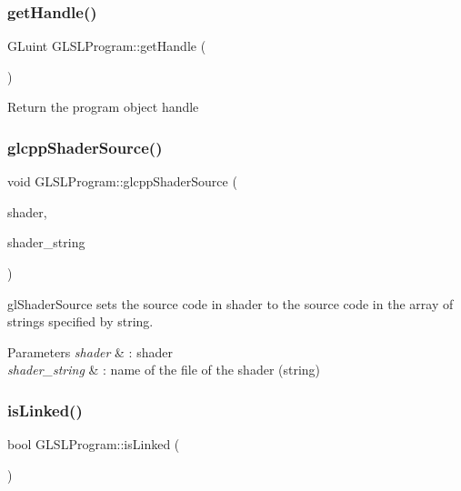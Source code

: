 \subsubsection{\texorpdfstring{get\+Handle()}{getHandle()}}
{\footnotesize\ttfamily G\+Luint G\+L\+S\+L\+Program\+::get\+Handle (\begin{DoxyParamCaption}{ }\end{DoxyParamCaption})}

Return the program object handle \hypertarget{class_g_l_s_l_program_ae34d52138ce5780b39a6396e68b90349}{}\label{class_g_l_s_l_program_ae34d52138ce5780b39a6396e68b90349} 
\subsubsection{\texorpdfstring{glcpp\+Shader\+Source()}{glcppShaderSource()}}
{\footnotesize\ttfamily void G\+L\+S\+L\+Program\+::glcpp\+Shader\+Source (\begin{DoxyParamCaption}\item[{G\+Luint}]{shader,  }\item[{std\+::string const \&}]{shader\+\_\+string }\end{DoxyParamCaption})}



gl\+Shader\+Source sets the source code in shader to the source code in the array of strings specified by string. 


\begin{DoxyParams}{Parameters}
{\em shader} & \+: shader \\
\hline
{\em shader\+\_\+string} & \+: name of the file of the shader (string) \\
\hline
\end{DoxyParams}
\hypertarget{class_g_l_s_l_program_ad0d1efa38db415e35d9a329a93828815}{}\label{class_g_l_s_l_program_ad0d1efa38db415e35d9a329a93828815} 
\subsubsection{\texorpdfstring{is\+Linked()}{isLinked()}}
{\footnotesize\ttfamily bool G\+L\+S\+L\+Program\+::is\+Linked (\begin{DoxyParamCaption}{ }\end{DoxyParamCaption})}

